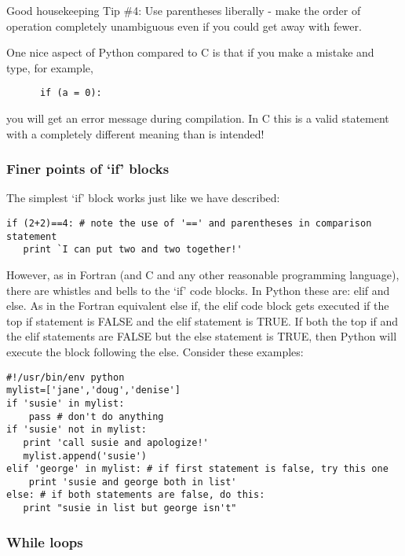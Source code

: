 {\noindent
{\color{magenta}Good housekeeping Tip \#4: Use parentheses liberally - make the order of operation completely unambiguous even if you could get away with fewer. }
  
  
One nice aspect of Python compared to C is that if you make
a mistake and type, for example,

{\color{blue}   \begin{verbatim}
      if (a = 0):
         \end{verbatim}}

\noindent you will get an error message during compilation.  In C this
is a valid statement with a completely different meaning
than is intended!  


\subsubsection{Finer points of `if' blocks}

The simplest `if' block works just like we have described:
{\singlespacing \color{blue} \begin{verbatim}
if (2+2)==4: # note the use of '==' and parentheses in comparison statement
   print `I can put two and two together!'
\end{verbatim}}

However, as in Fortran (and C and any other reasonable programming language), there are whistles and bells to the `if' code blocks.  In Python these are:  {\color{blue}elif} and {\color{blue}else}.  
As in the Fortran equivalent {\color{blue}else if},  the {\color{blue}elif}  code block gets executed if the top {\color{blue}if} statement is FALSE and the  {\color{blue}elif}  statement is TRUE.  If both the top {\color{blue}if} and the {\color{blue}elif}  statements are FALSE but the  {\color{blue}else}  statement is TRUE, then Python will execute the block following the  {\color{blue}else}.  Consider these examples:

{\singlespacing \color{blue} \begin{verbatim}
#!/usr/bin/env python
mylist=['jane','doug','denise']
if 'susie' in mylist:
    pass # don't do anything
if 'susie' not in mylist:
   print 'call susie and apologize!'
   mylist.append('susie')
elif 'george' in mylist: # if first statement is false, try this one
    print 'susie and george both in list' 
else: # if both statements are false, do this:
   print "susie in list but george isn't"
\end{verbatim}}

\subsubsection{While loops}

}
